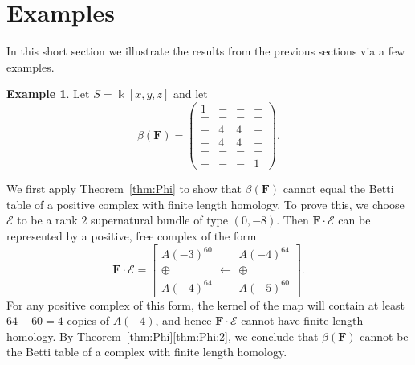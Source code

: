 \documentclass[12pt]{amsart}
\theoremstyle{definition}
\newtheorem{example}[lemma]{Example}
\theoremstyle{remark}
\newcommand{\kk}{\Bbbk}
\newcommand{\cE}{\mathcal{E}}
\newcommand{\FF}{\mathbf{F}}
\begin{document}
\section{Examples}\label{sec:examples}
In this short section we illustrate the results from the previous sections via a few examples.
\begin{example}\label{ex:1441}
Let $S=\kk[x,y,z]$ and let
\begin{equation}\label{eqn:intro ex}
\beta(\FF)=\begin{pmatrix} 1&-&-&-\\ -&-&-&-\\-&4&4&-\\-&4&4&-\\-&-&-&-\\-&-&-&1 \end{pmatrix}.
\end{equation}


We first apply Theorem~\ref{thm:Phi} to show that $\beta(\FF)$ cannot equal the Betti table of a positive complex with finite length homology.  To prove this, we choose $\cE$ to be a rank $2$ supernatural bundle of type $(0,-8)$.  Then $\FF\cdot \cE$ can be represented by a positive, free complex of the form
\[
\FF\cdot \cE=\left[ \begin{matrix}A(-3)^{60}\\ \oplus \\A(-4)^{64}\end{matrix} \longleftarrow \begin{matrix}A(-4)^{64}\\\oplus \\ A(-5)^{60}\end{matrix}\right].
\]
For any positive complex of this form, the kernel of the map will contain at least $64-60=4$ copies of $A(-4)$, and hence $\FF\cdot \cE$ cannot have finite length homology.  By Theorem~\ref{thm:Phi}\eqref{thm:Phi:2}, we conclude that $\beta(\FF)$ cannot be the Betti table of a complex with finite length homology.


\end{example}
\end{document}
